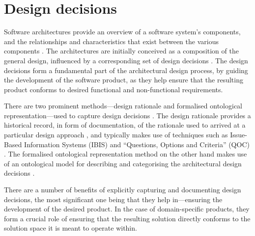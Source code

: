 \section{Design decisions}
\label{sec:background:software-design-decisions}

Software architectures provide an overview of a software system's components, and the relationships and characteristics that exist between the various components \citep{Lee2007}. The architectures are initially conceived as a composition of the general design, influenced by a corresponding set of design decisions \citep{Kruchten2005}. The design decisions form a fundamental part of the architectural design process, by guiding the development of the software product, as they help ensure that the resulting product conforms to desired functional and non-functional requirements.

There are two prominent methods---design rationale and formalised ontological representation---used to capture design decisions \citep{Lee2007}. The design rationale provides a historical record, in form of documentation, of the rationale used to arrived at a particular design approach \citep{Lee1991}, and typically makes use of techniques such as Issue-Based Information Systems (IBIS) \citep{Conklin1991} and ``Questions, Options and Criteria'' (QOC) \citep{MacLean1991}. The formalised ontological representation method on the other hand makes use of an ontological model for describing and categorising the architectural design decisions \citep{Kruchten2004}.

There are a number of benefits of explicitly capturing and documenting design decisions, the most significant one being that they help in---ensuring the development of the desired product. In the case of domain-specific products, they form a crucial role of ensuring that the resulting solution directly conforms to the solution space it is meant to operate within.



%  

